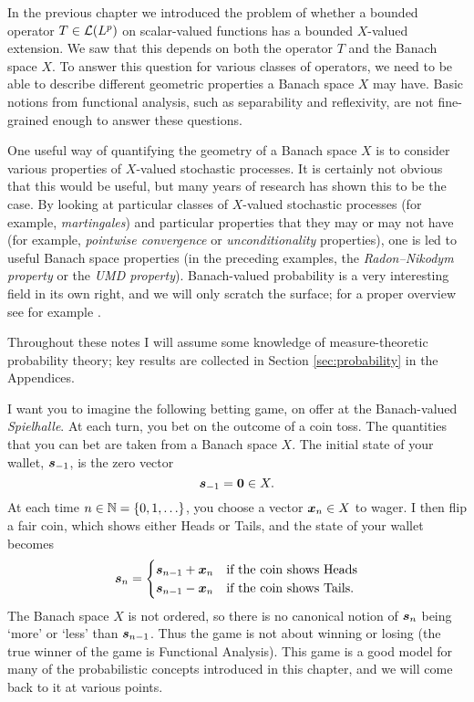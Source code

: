 In the previous chapter we introduced the problem of whether a bounded operator $T \in \mathcal{L}(L^p)$ on scalar-valued functions has a bounded $X$-valued extension.
We saw that this depends on both the operator $T$ and the Banach space $X$.
To answer this question for various classes of operators, we need to be able to describe different geometric properties a Banach space $X$ may have.
Basic notions from functional analysis, such as separability and reflexivity, are not fine-grained enough to answer these questions.

One useful way of quantifying the geometry of a Banach space $X$ is to consider various properties of $X$-valued stochastic processes.
It is certainly not obvious that this would be useful, but many years of research has shown this to be the case.
By looking at particular classes of $X$-valued stochastic processes (for example, \emph{martingales}) and particular properties that they may or may not have (for example, \emph{pointwise convergence} or \emph{unconditionality} properties), one is led to useful Banach space properties (in the preceding examples, the \emph{Radon--Nikodym property} or the \emph{UMD property}).
Banach-valued probability is a very interesting field in its own right, and we will only scratch the surface; for a proper overview see for example \cite{LT91}.

Throughout these notes I will assume some knowledge of measure-theoretic probability theory; key results are collected in Section \ref{sec:probability} in the Appendices.

I want you to imagine the following betting game, on offer at the Banach-valued \emph{Spielhalle}.
At each turn, you bet on the outcome of a coin toss.
The quantities that you can bet are taken from a Banach space $X$.
The initial state of your wallet, $\bm{s}_{-1}$, is the zero vector
\begin{equation*}
  \bm{s}_{-1} = \bm{0} \in X.
\end{equation*}
At each time $n \in \mathbb{N} = \{0,1,\ldots\}$, you choose a vector $\bm{x}_n \in X$ to wager.
I then flip a fair coin, which shows either Heads or Tails, and the state of your wallet becomes
\begin{equation*}
  \bm{s}_n =
  \begin{cases}
    \bm{s}_{n-1} + \bm{x}_n & \text{if the coin shows Heads} \\
    \bm{s}_{n-1} - \bm{x}_n & \text{if the coin shows Tails.}
  \end{cases}
\end{equation*}
The Banach space $X$ is not ordered, so there is no canonical notion of $\bm{s}_n$ being `more' or `less' than $\bm{s}_{n-1}$. Thus the game is not about winning or losing (the true winner of the game is Functional Analysis).
This game is a good model for many of the probabilistic concepts introduced in this chapter, and we will come back to it at various points.


